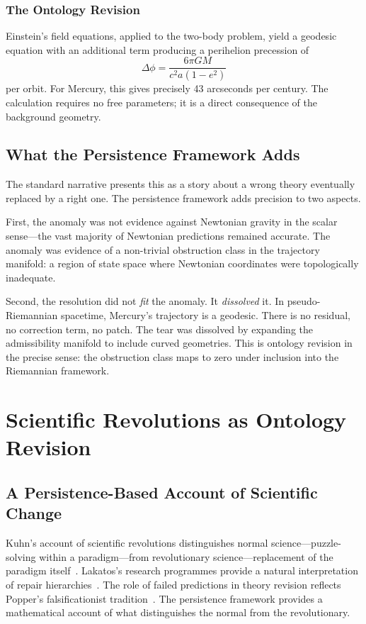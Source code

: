 \documentclass[12pt,oneside]{book}
\theoremstyle{plain}
\theoremstyle{definition}
\theoremstyle{remark}
\newcommand{\1}{\mathbf{1}}
\begin{document}
\subsection{The Ontology Revision}
Einstein's field equations, applied to the two-body problem, yield a geodesic equation with an additional term producing a perihelion precession of~\cite{einstein1916}
\[
\Delta\phi = \frac{6\pi G M}{c^2 a (1-e^2)}
\]
per orbit. For Mercury, this gives precisely 43 arcseconds per century. The calculation requires no free parameters; it is a direct consequence of the background geometry.

\section{What the Persistence Framework Adds}

The standard narrative presents this as a story about a wrong theory eventually replaced by a right one. The persistence framework adds precision to two aspects.

First, the anomaly was not evidence against Newtonian gravity in the scalar sense---the vast majority of Newtonian predictions remained accurate. The anomaly was evidence of a non-trivial obstruction class in the trajectory manifold: a region of state space where Newtonian coordinates were topologically inadequate.

Second, the resolution did not \emph{fit} the anomaly. It \emph{dissolved} it. In pseudo-Riemannian spacetime, Mercury's trajectory is a geodesic. There is no residual, no correction term, no patch. The tear was dissolved by expanding the admissibility manifold to include curved geometries. This is ontology revision in the precise sense: the obstruction class maps to zero under inclusion into the Riemannian framework.


\chapter{Scientific Revolutions as Ontology Revision}

\section{A Persistence-Based Account of Scientific Change}

Kuhn's account of scientific revolutions distinguishes normal science---puzzle-solving within a paradigm---from revolutionary science---replacement of the paradigm itself~\cite{kuhn1962}. Lakatos's research programmes provide a natural interpretation of repair hierarchies~\cite{lakatos1978}. The role of failed predictions in theory revision reflects Popper's falsificationist tradition~\cite{popper1959}. The persistence framework provides a mathematical account of what distinguishes the normal from the revolutionary.
\end{document}
